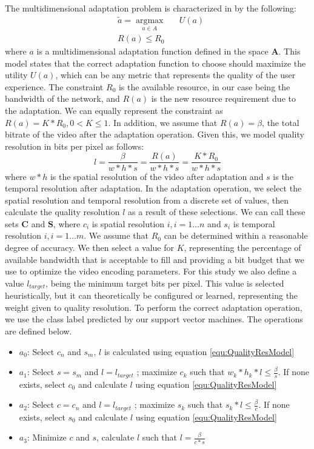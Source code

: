 The multidimensional adaptation problem is characterized in \cite{wang2005classification} by the following:
\begin{equation}
\begin{aligned}
\label{equ:UtilityFunction}
& \tilde{a}=\underset{a \in A}{\operatorname{argmax}} 
& & U(a) \\
& R(a) \le R_0
\end{aligned}
\end{equation}
where $a$ is a multidimensional adaptation function defined in the space $\mathbf{A}$. This model states that the correct adaptation function to choose should maximize the utility $U(a)$, which can be any metric that represents the quality of the user experience. The constraint $R_0$ is the available resource, in our case being the bandwidth of the network, and $R(a)$ is the new resource requirement due to the adaptation. We can equally represent the constraint as $R(a)=K*R_0,0<K\le 1$.  In addition, we assume that $R(a)=\beta$, the total bitrate of the video after the adaptation operation. Given this, we model quality resolution in bits per pixel as follows:
\begin{equation}
\label{equ:QualityResModel}
l=\frac{\beta}{w*h*s}=\frac {R(a)} {w*h*s}=\frac {K*R_0} {w*h*s}
\end{equation}
where $w*h$ is the spatial resolution of the video after adaptation and $s$ is the temporal resolution after adaptation. In the adaptation operation, we select the spatial resolution and temporal resolution from a discrete set of values, then calculate the quality resolution $l$ as a result of these selections. We can call these sets $\mathbf{C}$ and $\mathbf{S}$, where $c_i$ is spatial resolution $i, i=1\ldots{n}$ and $s_i$ is temporal resolution $i, i=1\ldots{m}$. We assume that $R_0$ can be determined within a reasonable degree of accuracy. We then select a value for $K$, representing the percentage of available bandwidth that is acceptable to fill and providing a bit budget that we use to optimize the video encoding parameters. For this study we also define a value $l_{target}$, being the minimum target bits per pixel. This value is selected heuristically, but it can theoretically be configured or learned, representing the weight given to quality resolution. To perform the correct adaptation operation, we use the class label predicted by our support vector machines. The operations are defined below.
\begin{itemize}
\item $a_0$: Select $c_n$ and $s_m$, $l$ is calculated using equation \ref{equ:QualityResModel}
\item $a_1$: Select  $s=s_m$ and $l=l_{target}$  ; maximize $c_k$ such that $w_k*h_k*l\le \frac {\beta} {s}$. If none exists, select $c_0$ and calculate $l$ using equation \ref{equ:QualityResModel}
\item $a_2$: Select $c=c_n$ and $l=l_{target}$ ; maximize $s_k$ such that $s_k*l\le \frac {\beta} {c}$. If none exists, select $s_0$ and calculate $l$ using equation \ref{equ:QualityResModel}
\item $a_3$:  Minimize $c$ and $s$, calculate $l$ such that $l=\frac{\beta}{c*s}$
\end{itemize}

